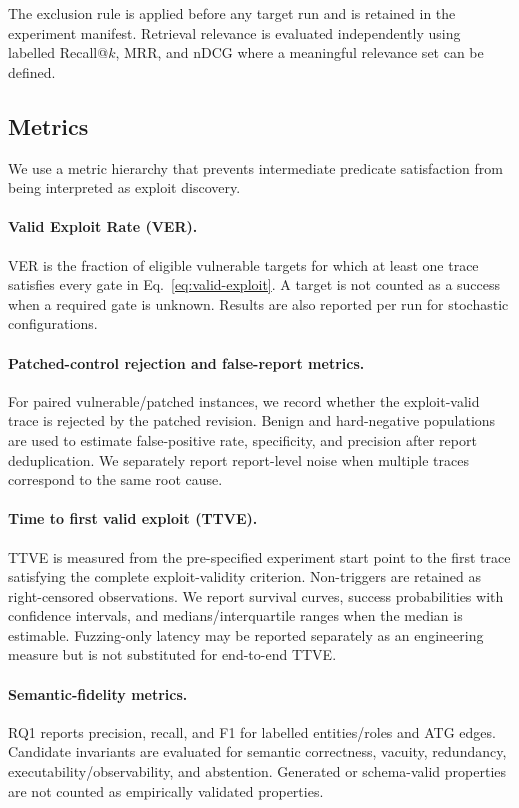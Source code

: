 The exclusion rule is applied before any target run and is retained in the experiment manifest. Retrieval relevance is evaluated independently using labelled Recall@$k$, MRR, and nDCG where a meaningful relevance set can be defined.

\subsection{Metrics}

We use a metric hierarchy that prevents intermediate predicate satisfaction from being interpreted as exploit discovery.

\paragraph{Valid Exploit Rate (VER).}
VER is the fraction of eligible vulnerable targets for which at least one trace satisfies every gate in Eq.~\ref{eq:valid-exploit}. A target is not counted as a success when a required gate is unknown. Results are also reported per run for stochastic configurations.

\paragraph{Patched-control rejection and false-report metrics.}
For paired vulnerable/patched instances, we record whether the exploit-valid trace is rejected by the patched revision. Benign and hard-negative populations are used to estimate false-positive rate, specificity, and precision after report deduplication. We separately report report-level noise when multiple traces correspond to the same root cause.

\paragraph{Time to first valid exploit (TTVE).}
TTVE is measured from the pre-specified experiment start point to the first trace satisfying the complete exploit-validity criterion. Non-triggers are retained as right-censored observations. We report survival curves, success probabilities with confidence intervals, and medians/interquartile ranges when the median is estimable. Fuzzing-only latency may be reported separately as an engineering measure but is not substituted for end-to-end TTVE.

\paragraph{Semantic-fidelity metrics.}
RQ1 reports precision, recall, and F1 for labelled entities/roles and ATG edges. Candidate invariants are evaluated for semantic correctness, vacuity, redundancy, executability/observability, and abstention. Generated or schema-valid properties are not counted as empirically validated properties.

